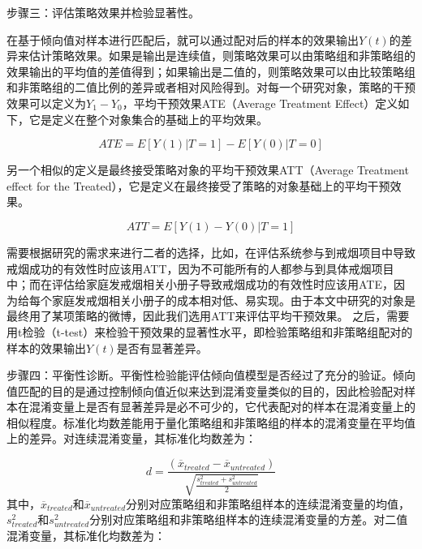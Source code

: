 步骤三：评估策略效果并检验显著性。

在基于倾向值对样本进行匹配后，就可以通过配对后的样本的效果输出$Y(t)$的差异来估计策略效果。如果是输出是连续值，则策略效果可以由策略组和非策略组的效果输出的平均值的差值得到；如果输出是二值的，则策略效果可以由比较策略组和非策略组的二值比例的差异或者相对风险得到。对每一个研究对象，策略的干预效果可以定义为$Y_1-Y_0$，平均干预效果ATE（Average Treatment Effect）定义如下，它是定义在整个对象集合的基础上的平均效果。

\begin{equation}ATE = E[Y(1)|T=1] - E[Y(0)|T=0]\end{equation}

另一个相似的定义是最终接受策略对象的平均干预效果ATT（Average Treatment effect for the Treated），它是定义在最终接受了策略的对象基础上的平均干预效果。

\begin{equation}ATT = E[Y(1) - Y(0) | T = 1]\end{equation}

需要根据研究的需求来进行二者的选择，比如，在评估系统参与到戒烟项目中导致
戒烟成功的有效性时应该用ATT，因为不可能所有的人都参与到具体戒烟项目中；而在评估给家庭发戒烟相关小册子导致戒烟成功的有效性时应该用ATE，因为给每个家庭发戒烟相关小册子的成本相对低、易实现。由于本文中研究的对象是最终用了某项策略的微博，因此我们选用ATT来评估平均干预效果。
之后，需要用t检验（t-test）来检验干预效果的显著性水平，即检验策略组和非策略组配对的样本的效果输出$Y(t)$是否有显著差异。


步骤四：平衡性诊断。平衡性检验能评估倾向值模型是否经过了充分的验证。倾向值匹配的目的是通过控制倾向值近似来达到混淆变量类似的目的，因此检验配对样本在混淆变量上是否有显著差异是必不可少的，它代表配对的样本在混淆变量上的相似程度。标准化均数差能用于量化策略组和非策略组的样本的混淆变量在平均值上的差异。对连续混淆变量，其标准化均数差为：

\begin{equation}d = \frac{(\overline{x}_{treated} - \overline{x}_{untreated})}{\sqrt{\frac{s_{treated}^2 + s_{untreated}^2}{2}}}\end{equation}
其中，$\overline{x}_{treated}$和$\overline{x}_{untreated}$分别对应策略组和非策略组样本的连续混淆变量的均值， $s_{treated}^2$和$s_{untreated}^2$分别对应策略组和非策略组样本的连续混淆变量的方差。对二值混淆变量，其标准化均数差为：

